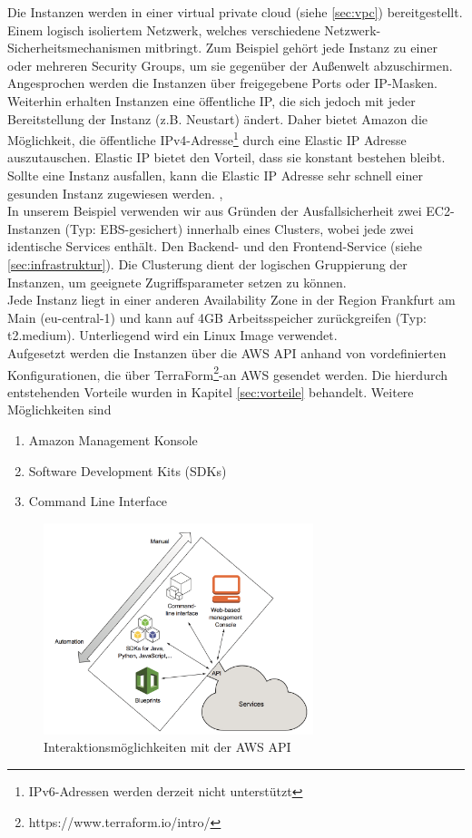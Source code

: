 Die Instanzen werden in einer virtual private cloud (siehe \ref{sec:vpc}) bereitgestellt. Einem logisch isoliertem Netzwerk, welches verschiedene Netzwerk-Sicherheitsmechanismen mitbringt. Zum Beispiel gehört jede Instanz zu einer oder mehreren Security Groups, um sie gegenüber der Außenwelt abzuschirmen. Angesprochen werden die Instanzen über freigegebene Ports oder IP-Masken. \\
Weiterhin erhalten Instanzen eine öffentliche IP, die sich jedoch mit jeder Bereitstellung der Instanz (z.B. Neustart) ändert. Daher bietet Amazon die Möglichkeit, die öffentliche IPv4-Adresse\footnote{IPv6-Adressen werden derzeit nicht unterstützt} durch eine Elastic IP Adresse auszutauschen. Elastic IP bietet den Vorteil, dass sie konstant bestehen bleibt. Sollte eine Instanz ausfallen, kann die Elastic IP Adresse sehr schnell einer gesunden Instanz zugewiesen werden.
\cite{vliet:resilience}, \cite{aws:eip} \\

In unserem Beispiel verwenden wir aus Gründen der Ausfallsicherheit zwei EC2-Instanzen (Typ: EBS-gesichert) innerhalb eines Clusters, wobei jede zwei identische Services enthält. Den Backend- und den Frontend-Service (siehe \ref{sec:infrastruktur}). Die Clusterung dient der logischen Gruppierung der Instanzen, um geeignete Zugriffsparameter setzen zu können. \\
Jede Instanz liegt in einer anderen Availability Zone in der Region Frankfurt am Main (eu-central-1) und kann auf 4GB Arbeitsspeicher zurückgreifen (Typ: t2.medium). Unterliegend wird ein Linux Image verwendet. \\
Aufgesetzt werden die Instanzen über die AWS API anhand von vordefinierten Konfigurationen, die über TerraForm\footnote{https://www.terraform.io/intro/}-an AWS gesendet werden. Die hierdurch entstehenden Vorteile wurden in Kapitel \ref{sec:vorteile} behandelt. Weitere Möglichkeiten sind
\begin{enumerate}
  \item Amazon Management Konsole
  \item Software Development Kits (SDKs)
  \item Command Line Interface
\end{enumerate} \cite{wittig:awsinaction}

\begin{figure}[!ht]
  \centering
  \includegraphics[width=0.7\textwidth]{images/awsapi.png}
  \caption{Interaktionsmöglichkeiten mit der AWS API \cite{wittig:awsinaction}}
\end{figure}


